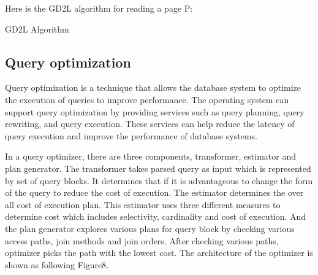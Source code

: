 \documentclass[11pt,a4paper]{article}
\begin{document}
Here is the GD2L algorithm for reading a page P:

\begin{minipage}[t]{0.8\textwidth}
    \begin{algorithm}[H]
        \BlankLine
        \caption{GD2L Algorithm}
    \end{algorithm}
    
\end{minipage}

\subsection{Query optimization}

Query optimization is a technique that allows the database system to optimize the execution of queries to improve performance.
The operating system can support query optimization by providing services such as query planning, query rewriting, and query execution.
These services can help reduce the latency of query execution and improve the performance of database systems.

In a query optimizer, there are three components, transformer, estimator and plan generator. 
The transformer takes parsed query as input which is represented by set of query blocks. 
It determines that if it is advantageous to change the form of the query to reduce the cost of execution.
The estimator determines the over all cost of execution plan. 
This estimator uses three different measures to determine cost which includes selectivity, cardinality and cost of execution.
And the plan generator explores various plans for query block by checking various access paths, join methods and join orders. 
After checking various paths, optimizer picks the path with the lowest cost.\cite{geeksforgeeks}
The architecture of the optimizer is shown as following Figure8.
\end{document}
